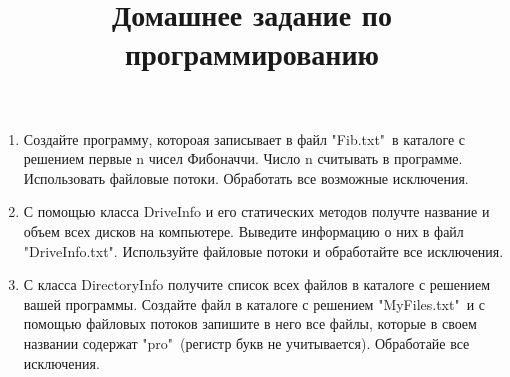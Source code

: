\documentclass[a4paper,12pt]{article} %
\author{}
\title{Домашнее задание по программированию}
\date{}
\begin{document}
	\maketitle
	
	\begin{enumerate}
		\item Создайте программу, котороая записывает в файл "Fib.txt"\ в каталоге с решением первые n чисел Фибоначчи. Число n считывать в программе. Использовать файловые потоки. Обработать все возможные исключения.
		 
		 \item С помощью класса DriveInfo и его статических методов получте название и объем всех дисков на компьютере. Выведите информацию о них в файл "DriveInfo.txt". Используйте файловые потоки и обработайте все исключения.
		 
		 \item С класса DirectoryInfo получите список всех файлов в каталоге с решением вашей программы. Создайте файл в каталоге с решением "MyFiles.txt"\ и с помощью файловых потоков запишите в него все файлы, которые в своем названии содержат "pro"\ (регистр букв не учитывается). Обработайе все исключения.
		 
	\end{enumerate}
	
\end{document}
